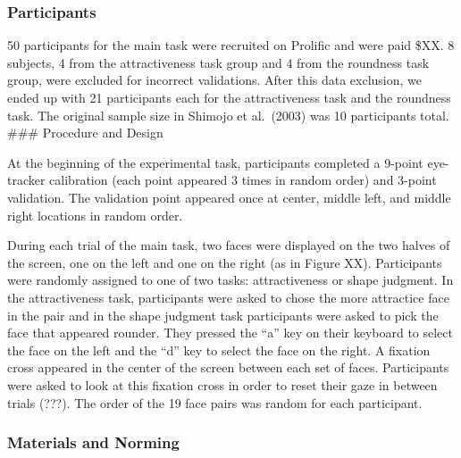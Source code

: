 \documentclass[
  man,floatsintext]{apa6}
\begin{document}
\hypertarget{participants-5}{%
\subsubsection{Participants}\label{participants-5}}

50 participants for the main task were recruited on Prolific and were
paid \$XX. 8 subjects, 4 from the attractiveness task group and 4 from
the roundness task group, were excluded for incorrect validations.
After this
data exclusion, we ended up with 21 participants each for the
attractiveness task and the roundness task. The original sample size in
Shimojo et al.~(2003) was 10 participants total. \#\#\# Procedure and
Design

At the beginning of the experimental task, participants completed a
9-point eye-tracker calibration (each point appeared 3 times in random
order) and 3-point validation. The validation point appeared once at
center, middle left, and middle right locations in random order.

During each trial of the main task, two faces were displayed on the two
halves of the screen, one on the left and one on the right (as in Figure
XX). Participants were randomly assigned to one of two tasks:
attractiveness or shape judgment. In the attractiveness task,
participants were asked to chose the more attractice face in the pair
and in the shape judgment task participants were asked to pick the face
that appeared rounder. They pressed the ``a'' key on their keyboard to
select the face on the left and the ``d'' key to select the face on the
right. A fixation cross appeared in the center of the screen between
each set of faces. Participants were asked to look at this fixation
cross in order to reset their gaze in between trials (???). The order of
the 19 face pairs was random for each participant.

\hypertarget{materials-and-norming}{%
\subsubsection{Materials and Norming}\label{materials-and-norming}}
\end{document}
